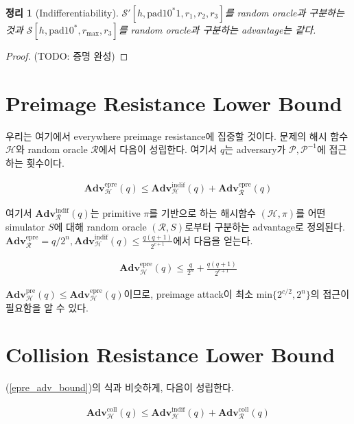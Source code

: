 \documentclass{article}
\newtheorem{theorem}{정리}
\newcommand{\adv}{\mathbf{Adv}}
\begin{document}
  \begin{theorem}[Indifferentiability]
    \(\mathcal{S}'[h, \mathrm{pad10^*1}, r_1, r_2, r_3]\)를 random oracle과 구분하는 것과 \(\mathcal{S}[h, \mathrm{pad10^*}, r_\mathrm{max}, r_3]\)를 random oracle과 구분하는 advantage는 같다.
  \end{theorem}
  \begin{proof}
    (TODO: 증명 완성)
  \end{proof}

  \section{Preimage Resistance Lower Bound}
  우리는 여기에서 everywhere preimage resistance에 집중할 것이다.\cite{rogaway_cryptographic_2004} 문제의 해시 함수 \(\mathcal{H}\)와 random oracle \(\mathcal{R}\)에서 다음이 성립한다.\cite{andreeva_security_2011} 여기서 \(q\)는 adversary가 \(\mathcal{P}, \mathcal{P}^{-1}\)에 접근하는 횟수이다.

  \begin{align}\label{epre_adv_bound}
    \adv^\text{epre}_\mathcal{H}(q) \leq \adv^\text{indif}_\mathcal{H}(q) + \adv^\text{epre}_\mathcal{R}(q)
  \end{align}

  여기서 \(\adv^\text{indif}_\mathcal{R}(q)\)는 primitive \(\pi\)를 기반으로 하는 해시함수 \((\mathcal{H}, \pi)\)를 어떤 simulator \(S\)에 대해 random oracle \((\mathcal{R}, S)\)로부터 구분하는 advantage로 정의된다. \(\adv^\text{epre}_\mathcal{R}=q/2^n, \adv^\text{indif}_\mathcal{H}(q)\leq \frac{q(q + 1)}{2^{c + 1}}\)에서 다음을 얻는다.

  \begin{align*}
    \adv^\text{epre}_\mathcal{H}(q) \leq \frac{q}{2^n} + \frac{q(q + 1)}{2^{c + 1}}
  \end{align*}

  \(\adv^\text{pre}_\mathcal{H}(q) \leq \adv^\text{epre}_\mathcal{H}(q)\)이므로\cite{rogaway_cryptographic_2004}, preimage attack이 최소 \(\mathrm{min}\{2^{c/2}, 2^n\}\)의 접근이 필요함을 알 수 있다.

  \section{Collision Resistance Lower Bound}
  (\ref{epre_adv_bound})의 식과 비슷하게, 다음이 성립한다.

  \begin{align*}
    \adv^\text{coll}_\mathcal{H}(q) \leq \adv^\text{indif}_\mathcal{H}(q) + \adv^\text{coll}_\mathcal{R}(q)
  \end{align*}
\end{document}
